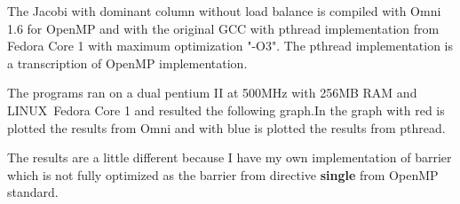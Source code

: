 \documentclass[a4paper]{article}
\begin{document}
The Jacobi with dominant column without load balance is compiled with Omni
1.6 for OpenMP and with the original GCC with pthread implementation from
Fedora Core 1 with maximum optimization "-O3". The pthread implementation is
a transcription of OpenMP implementation.

The programs ran on a dual pentium II at 500MHz with 256MB RAM and LINUX\
Fedora Core 1 and resulted the following graph.In the graph with red is
plotted the results from Omni and with blue is plotted the results from
pthread.

The results are a little different because I have my own implementation of
barrier which is not fully optimized as the barrier from directive \textbf{%
single} from OpenMP standard.

\begin{center}
\end{center}
\end{document}

